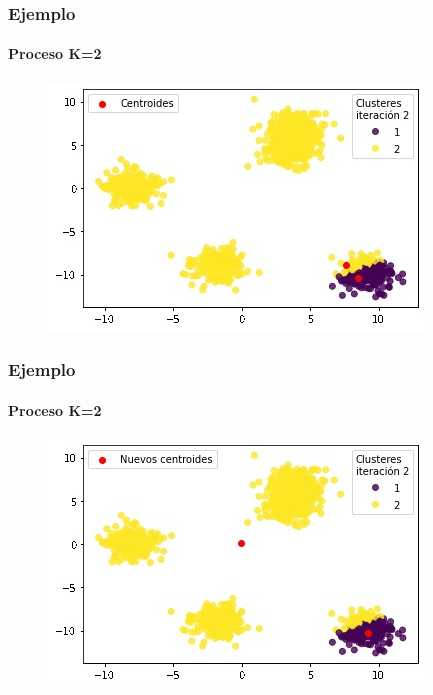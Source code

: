 \documentclass[
  shownotes,
  xcolor={svgnames},
  hyperref={colorlinks,citecolor=DarkBlue,linkcolor=DarkRed,urlcolor=DarkBlue}
  , aspectratio=169]{beamer}
\begin{document}
\begin{frame}
\frametitle{Ejemplo}
\framesubtitle{Proceso K=2}


\begin{figure}[H] \centering

    \centering
    \includegraphics[scale=.7]{figures/k2_1.jpg}
  \\
  \tiny
\end{figure}


\end{frame}
\begin{frame}
\frametitle{Ejemplo}
\framesubtitle{Proceso K=2}


\begin{figure}[H] \centering

    \centering
    \includegraphics[scale=.7]{figures/k2_2.jpg}
  \\
  \tiny
\end{figure}



\end{frame}
\end{document}
